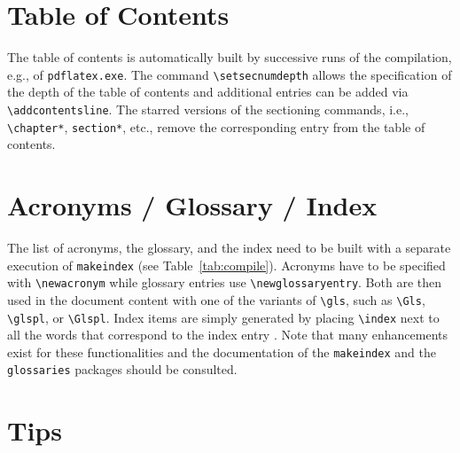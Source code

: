 \section{Table of Contents}

The table of contents is automatically built by successive runs of the compilation, e.g., of \verb|pdflatex.exe|.
The command \verb|\setsecnumdepth| allows the specification of the depth of the table of contents and additional entries can be added via \verb|\addcontentsline|.
The starred versions of the sectioning commands, i.e., \verb|\chapter*|, \verb|section*|, etc., remove the corresponding entry from the table of contents.

\section{Acronyms / Glossary / Index}

The list of acronyms, the glossary, and the index need to be built with a separate execution of \verb|makeindex| (see Table~\ref{tab:compile}).
Acronyms have to be specified with \verb|\newacronym| while glossary entries use \verb|\newglossaryentry|.
Both are then used in the document content with one of the variants of \verb|\gls|, such as \verb|\Gls|, \verb|\glspl|, or \verb|\Glspl|.
Index items are simply generated by placing \verb|\index| next to all the words that correspond to the index entry .
Note that many enhancements exist for these functionalities and the documentation of the \verb|makeindex| and the \verb|glossaries| packages should be consulted.

\section{Tips}

